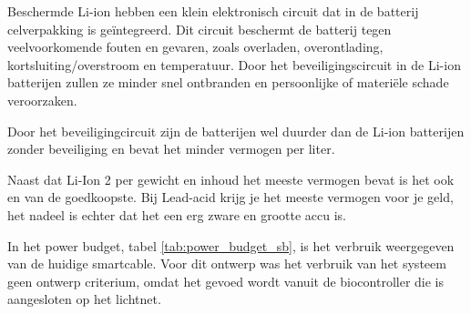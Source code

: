 Beschermde Li-ion hebben een klein elektronisch circuit dat in de batterij celverpakking is geïntegreerd. Dit circuit beschermt de batterij tegen veelvoorkomende fouten en gevaren, zoals overladen, overontlading, kortsluiting/overstroom en temperatuur. Door het beveiligingscircuit in de Li-ion batterijen zullen ze minder snel ontbranden en persoonlijke of materiële schade veroorzaken.

Door het beveiligingcircuit zijn de batterijen wel duurder dan de Li-ion batterijen zonder beveiliging en bevat het minder vermogen per liter. 

Naast dat Li-Ion 2 per gewicht en inhoud het meeste vermogen bevat is het ook en van de goedkoopste. Bij Lead-acid krijg je het meeste vermogen voor je geld, het nadeel is echter dat het een erg zware en grootte accu is.



In het power budget, tabel \ref{tab:power_budget_sb}, is het verbruik weergegeven van de huidige smartcable. Voor dit ontwerp was het verbruik van het systeem geen ontwerp criterium, omdat het gevoed wordt vanuit de biocontroller die is aangesloten op het lichtnet. 

\begin{table}[H]
	\centering
	\caption{Power budget van de bioreactor module}
	\label{tab:power_budget_sb}
\end{table}

